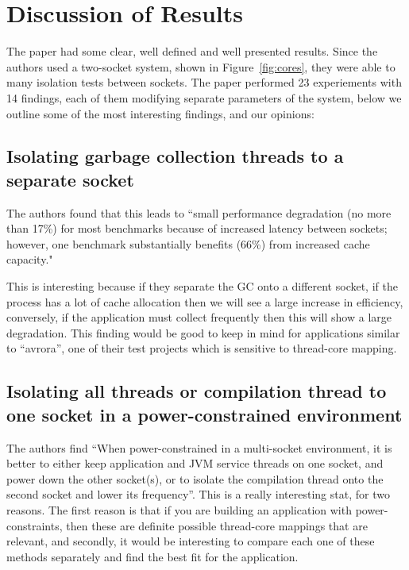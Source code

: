 \documentclass[conference]{IEEEtran}
\begin{document}
\section{Discussion of Results}
The paper had some clear, well defined and well presented results.  Since the authors used a two-socket system, shown in Figure~\ref{fig:cores}, they were able to many isolation tests between sockets.  The paper performed 23 experiements with 14 findings, each of them modifying separate parameters of the system, below we outline some of the most interesting findings, and our opinions:

\subsection{Isolating garbage collection threads to a separate socket}
 
The authors found that this leads to ``small performance degradation (no more than 17\%) for most benchmarks because of increased latency between sockets; however, one benchmark substantially benefits (66\%) from increased cache capacity."

This is interesting because if they separate the GC onto a different socket, if the process has a lot of cache allocation then we will see a large increase in efficiency, conversely, if the application must collect frequently then this will show a large degradation.  This finding would be good to keep in mind for applications similar to ``avrora'', one of their test projects which is sensitive to thread-core mapping.

\subsection{Isolating all threads or compilation thread to one socket in a power-constrained environment}

The authors find ``When power-constrained in a multi-socket environment, it is better to either keep application and JVM service threads on one socket, and power down the other socket(s), or to isolate the compilation thread onto the second socket and lower its frequency''. This is a really interesting stat, for two reasons.  The first reason is that if you are building an application with power-constraints, then these are definite possible thread-core mappings that are relevant, and secondly, it would be interesting to compare each one of these methods separately and find the best fit for the application.  
\end{document}
